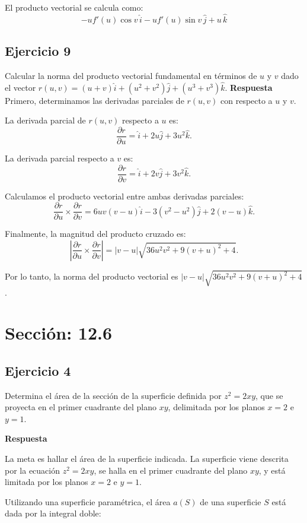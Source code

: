 \documentclass{report}
\begin{document}
El producto vectorial se calcula como:
\[
- u f'(u) \cos v \, \hat{i} - u f'(u) \sin v \, \hat{j} + u \, \hat{k}
\]

\newpage

\subsection*{Ejercicio 9}
Calcular la norma del producto vectorial fundamental en términos de \( u \) y \( v \) dado el vector \( r(u, v)=(u+v) \hat{i}+\left(u^2+v^2\right) \hat{j}+\left(u^3+v^3\right) \hat{k} \).
\textbf{Respuesta}
Primero, determinamos las derivadas parciales de \( r(u, v) \) con respecto a \( u \) y \( v \).

La derivada parcial de \( r(u, v) \) respecto a \( u \) es:
\[
\frac{\partial r}{\partial u} = \hat{i} + 2u \hat{j} + 3u^2 \hat{k}.
\]

La derivada parcial respecto a \( v \) es:
\[
\frac{\partial r}{\partial v} = \hat{i} + 2v \hat{j} + 3v^2 \hat{k}.
\]

Calculamos el producto vectorial entre ambas derivadas parciales:
\[
\frac{\partial r}{\partial u} \times \frac{\partial r}{\partial v} = 6 u v (v - u) \hat{i} - 3 (v^2 - u^2) \hat{j} + 2 (v - u) \hat{k}.
\]

Finalmente, la magnitud del producto cruzado es:
\[
\left| \frac{\partial r}{\partial u} \times \frac{\partial r}{\partial v} \right| = |v - u| \sqrt{36 u^2 v^2 + 9 (v + u)^2 + 4}.
\]

Por lo tanto, la norma del producto vectorial es \( |v - u| \sqrt{36 u^2 v^2 + 9 (v + u)^2 + 4} \).
\section*{\textcolor{color126}{Sección: 12.6}}
\subsection*{Ejercicio 4}
Determina el área de la sección de la superficie definida por $z^2 = 2xy$, que se proyecta en el primer cuadrante del plano $xy$, delimitada por los planos $x = 2$ e $y = 1$.

\textbf{Respuesta}

La meta es hallar el área de la superficie indicada. La superficie viene descrita por la ecuación $z^2 = 2xy$, se halla en el primer cuadrante del plano $xy$, y está limitada por los planos $x = 2$ e $y = 1$.

Utilizando una superficie paramétrica, el área $a(S)$ de una superficie $S$ está dada por la integral doble:
\end{document}
